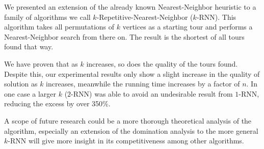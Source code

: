 \documentclass[11pt]{article}
\begin{document}
	We presented an extension of the already known Nearest-Neighbor heuristic to a family of algorithms we call $k$-Repetitive-Nearest-Neighbor ($k$-RNN). 
	This algorithm takes all permutations of $k$ vertices as a starting tour and performs a Nearest-Neighbor search from there on. 
	The result is the shortest of all tours found that way.
	
	We have proven that as $k$ increases, so does the quality of the tours found.
	Despite this, our experimental results only show a slight increase in the quality of solution as $k$ increases, meanwhile the running time increases by a factor of $n$.
	In one case a larger $k$ ($2$-RNN) was able to avoid an undesirable result from $1$-RNN, reducing the excess by over 350\%.
	
	
	A scope of future research could be a more thorough theoretical analysis of the algorithm, especially an extension of the domination analysis to the more general $k$-RNN will give more insight in its competitiveness among other algorithms. 

	
	
	
	
\end{document}
